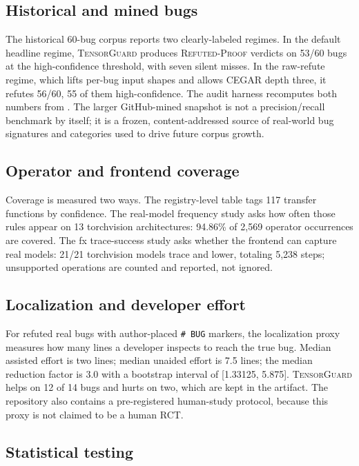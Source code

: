 \documentclass[11pt]{article}
\newcommand{\tg}{\textsc{TensorGuard}}
\newcommand{\rp}{\textsc{Refuted-Proof}}
\begin{document}
\subsection{Historical and mined bugs}

The historical 60-bug corpus reports two clearly-labeled regimes.  In the
default headline regime, \tg{} produces \rp{} verdicts on 53/60 bugs at the
high-confidence threshold, with seven silent misses.  In the raw-refute regime,
which lifts per-bug input shapes and allows CEGAR depth three, it refutes 56/60,
55 of them high-confidence.  The audit harness recomputes both numbers from
.  The larger GitHub-mined
snapshot is not a precision/recall benchmark by itself; it is a frozen,
content-addressed source of real-world bug signatures and categories used to
drive future corpus growth.

\subsection{Operator and frontend coverage}

Coverage is measured two ways.  The registry-level table tags 117 transfer
functions by confidence.  The real-model frequency study asks how often those
rules appear on 13 torchvision architectures: 94.86\% of 2,569 operator
occurrences are covered.  The fx trace-success study asks whether the frontend
can capture real models: 21/21 torchvision models trace and lower, totaling
5,238 steps; unsupported operations are counted and reported, not ignored.

\subsection{Localization and developer effort}

For refuted real bugs with author-placed \texttt{\# BUG} markers, the
localization proxy measures how many lines a developer inspects to reach the
true bug.  Median assisted effort is two lines; median unaided effort is 7.5
lines; the median reduction factor is 3.0 with a bootstrap interval of
[1.33125, 5.875].  \tg{} helps on 12 of 14 bugs and hurts on two, which are kept
in the artifact.  The repository also contains a pre-registered human-study
protocol, because this proxy is not claimed to be a human RCT.

\subsection{Statistical testing}
\end{document}
